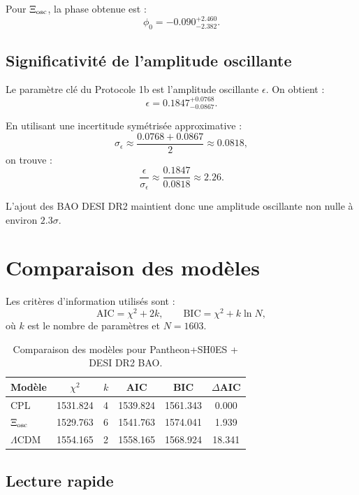 \documentclass[11pt]{article}
\newcommand{\LCDM}{$\Lambda$CDM}
\newcommand{\Xiosc}{$\Xi_{\rm osc}$}
\begin{document}
Pour \Xiosc, la phase obtenue est :
\[
    \phi_0=-0.090^{+2.460}_{-2.382}.
\]

\subsection{Significativité de l'amplitude oscillante}

Le paramètre clé du Protocole 1b est l'amplitude oscillante $\epsilon$. On obtient :
\begin{equation}
    \epsilon=0.1847^{+0.0768}_{-0.0867}.
\end{equation}

En utilisant une incertitude symétrisée approximative :
\[
    \sigma_\epsilon\approx\frac{0.0768+0.0867}{2}\approx0.0818,
\]
on trouve :
\begin{equation}
    \frac{\epsilon}{\sigma_\epsilon}\approx\frac{0.1847}{0.0818}\approx2.26.
\end{equation}

L'ajout des BAO DESI DR2 maintient donc une amplitude oscillante non nulle à environ $2.3\sigma$.

\section{Comparaison des modèles}

Les critères d'information utilisés sont :
\begin{equation}
    \mathrm{AIC}=\chi^2+2k,
    \qquad
    \mathrm{BIC}=\chi^2+k\ln N,
\end{equation}
où $k$ est le nombre de paramètres et $N=1603$.

\begin{table}[H]
\centering
\caption{Comparaison des modèles pour Pantheon+SH0ES + DESI DR2 BAO.}
\label{tab:aicbic}
\begin{tabular}{lccccc}
\toprule
Modèle & $\chi^2$ & $k$ & AIC & BIC & $\Delta$AIC \\
\midrule
CPL & 1531.824 & 4 & 1539.824 & 1561.343 & 0.000 \\
\Xiosc & 1529.763 & 6 & 1541.763 & 1574.041 & 1.939 \\
\LCDM & 1554.165 & 2 & 1558.165 & 1568.924 & 18.341 \\
\bottomrule
\end{tabular}
\end{table}

\subsection*{Lecture rapide}
\end{document}
